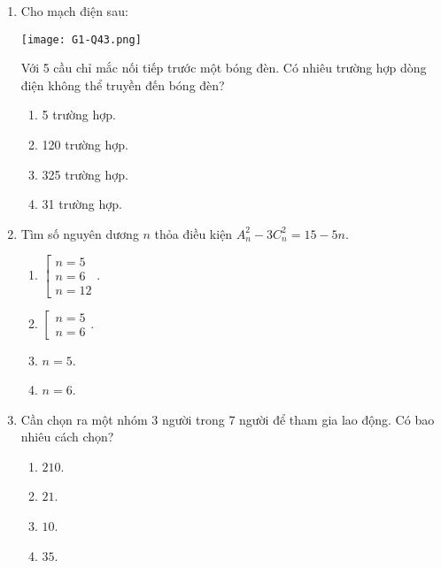 \begin{enumerate}[label=\textbf{Câu \arabic*.},align=left,left=0cm..0cm,itemindent=*]
\begin{enumerate}[label=\textbf{\Alph*.},align=left,left=1cm..0cm,itemindent=*]
	\end{enumerate}
	\item Cho mạch điện sau:\par
	{\centering\texttt{[image: G1-Q43.png]}\par}
	Với 5 cầu chỉ mắc nối tiếp trước một bóng đèn. Có nhiêu trường hợp dòng điện không thể truyền đến bóng đèn?
	\begin{enumerate}[label=\textbf{\Alph*.},align=left,left=1cm..0cm,itemindent=*]
	    \item 5 trường hợp. \item 120 trường hợp. \item 325 trường hợp. \item 31 trường hợp.
	\end{enumerate}
	\item Tìm số nguyên dương $n$ thỏa điều kiện $A_{n}^{2}-3C_{n}^{2}=15-5n$.
	\begin{enumerate}[label=\textbf{\Alph*.},align=left,left=1cm..0cm,itemindent=*]
	    \item $\left[ \begin{array}{l} n=5\\ n=6\\ n=12 \end{array} \right.$.
	    \item $\left[ \begin{array}{l} n=5\\ n=6 \end{array} \right.$.
	    \item $n=5$. \item $n=6$.
	\end{enumerate}
	\item Cần chọn ra một nhóm 3 người trong 7 người để tham gia lao động. Có bao nhiêu cách chọn?
	\begin{enumerate}[label=\textbf{\Alph*.},align=left,left=1cm..0cm,itemindent=*]
	    \item $210$. \item $21$. \item $10$. \item $35$.
	\end{enumerate}
\end{enumerate}\par

